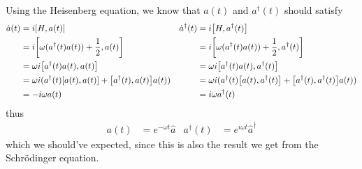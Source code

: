 \documentclass[notes.tex]{subfiles}
\begin{document}
Using the Heisenberg equation, we know that $a(t)$ and $a^\dagger(t)$ should satisfy
\begin{align*}
    \dot{a}(t) &= i\commutator{H}{a(t)} & \dot{a}^\dagger(t) &= i\commutator{H}{a^\dagger(t)}\\
    &= i\commutator{\omega(a^\dagger(t)a(t)) + \frac{1}{2}}{a(t)} &&= i\commutator{\omega(a^\dagger(t)a(t)) + \frac{1}{2}}{a^\dagger(t)}\\
    &= \omega i\commutator{a^\dagger(t)a(t)}{a(t)} &&= \omega i\commutator{a^\dagger(t)a(t)}{a^\dagger(t)}\\
    &= \omega i (a^\dagger(t) \commutator{a(t)}{a(t)} + \commutator{a^\dagger(t)}{a(t)}a(t))&&=\omega i (a^\dagger(t) \commutator{a(t)}{a^\dagger(t)} + \commutator{a^\dagger(t)}{a^\dagger(t)}a(t))\\
    &= -i\omega a(t) &&= i\omega a^\dagger(t)
\end{align*}
thus
\begin{align*}
    a(t) &= e^{-\omega t} \hat{a} & a^\dagger(t) &= e^{i\omega t} \hat{a}^\dagger
\end{align*}
which we should've expected, since this is also the result we get from the Schr\"odinger equation.
\end{document}
